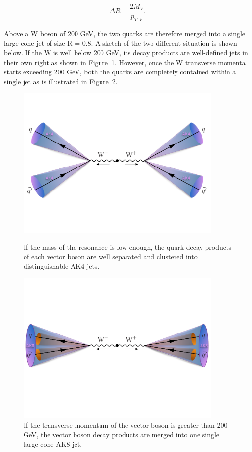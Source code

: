 \begin{equation}  
\Delta R = \frac{2 M_{V}}{p_{T,V}}.  
\end{equation}

Above a W boson \PT of 200 GeV, the two quarks are therefore merged into a single large cone jet of size R = 0.8. A sketch of the two different situation is shown below. If the W \PT is well below 200 GeV, its decay products are well-defined jets in their own right as shown in Figure~\ref{fig:objreco:unmerged}. However, once the W transverse momenta starts exceeding 200 GeV, both the quarks are completely contained within a single jet as is illustrated in Figure~\ref{fig:objreco:merged}.
   
\begin{figure}[ht] 
    \centering
    \includegraphics[width=0.90\textwidth]{figures/event_reconstruction/WWqqqq_unmerged_small.pdf}\\
    \caption{If the mass of the resonance is low enough, the quark decay products of each vector boson are well separated and clustered into distinguishable AK4 jets.}
    \label{fig:objreco:unmerged}
\end{figure}

\begin{figure}[ht] 
    \centering
    \includegraphics[width=0.90\textwidth]{figures/event_reconstruction/WWqqqq_merged_small.pdf}
    \caption{If the transverse momentum of the vector boson is greater than 200 GeV, the vector boson decay products are merged into one single large cone AK8 jet.}
    \label{fig:objreco:merged}
\end{figure}

